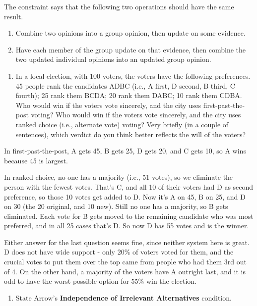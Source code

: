 \documentclass[
  12pt,
  letterpaper,
  DIV=11,
  numbers=noendperiod]{scrartcl}
\providecommand{\tightlist}{%
  \setlength{\itemsep}{0pt}\setlength{\parskip}{0pt}}\usepackage{longtable,booktabs,array}
\begin{document}
The constraint says that the following two operations should have the
same result.

\begin{enumerate}
\def\labelenumi{\Alph{enumi}.}
\tightlist
\item
  Combine two opinions into a group opinion, then update on some
  evidence.
\item
  Have each member of the group update on that evidence, then combine
  the two updated individual opinions into an updated group opinion.
\end{enumerate}

\begin{enumerate}
\def\labelenumi{\arabic{enumi}.}
\setcounter{enumi}{2}
\tightlist
\item
  In a local election, with 100 voters, the voters have the following
  preferences. 45 people rank the candidates ADBC (i.e., A first, D
  second, B third, C fourth); 25 rank them BCDA; 20 rank them DABC; 10
  rank them CDBA. Who would win if the voters vote sincerely, and the
  city uses first-past-the-post voting? Who would win if the voters vote
  sincerely, and the city uses ranked choice (i.e., alternate vote)
  voting? Very briefly (in a couple of sentences), which verdict do you
  think better reflects the will of the voters?
\end{enumerate}

In first-past-the-post, A gets 45, B gets 25, D gets 20, and C gets 10,
so A wins because 45 is largest.

In ranked choice, no one has a majority (i.e., 51 votes), so we
eliminate the person with the fewest votes. That's C, and all 10 of
their voters had D as second preference, so those 10 votes get added to
D. Now it's A on 45, B on 25, and D on 30 (the 20 original, and 10 new).
Still no one has a majority, so B gets eliminated. Each vote for B gets
moved to the remaining candidate who was most preferred, and in all 25
cases that's D. So now D has 55 votes and is the winner.

Either answer for the last question seems fine, since neither system
here is great. D does not have wide support - only 20\% of voters voted
for them, and the crucial votes to put them over the top came from
people who had them 3rd out of 4. On the other hand, a majority of the
voters have A outright last, and it is odd to have the worst possible
option for 55\% win the election.

\begin{enumerate}
\def\labelenumi{\arabic{enumi}.}
\setcounter{enumi}{3}
\tightlist
\item
  State Arrow's \textbf{Independence of Irrelevant Alternatives}
  condition.
\end{enumerate}
\end{document}

